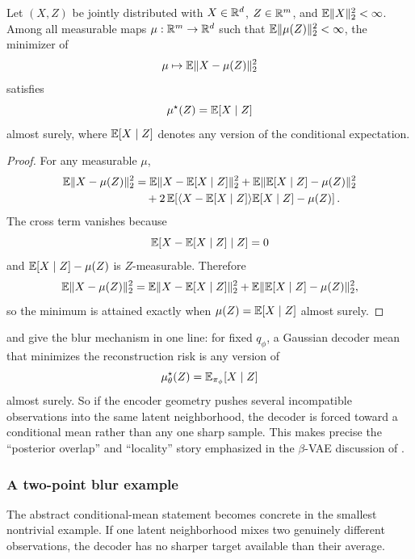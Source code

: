 \documentclass[11pt]{article}
\begin{document}
\begin{proposition}
\label{prop:squared-error-mean}
Let \((X,Z)\) be jointly distributed with \(X\in\mathbb{R}^d\), \(Z\in\mathbb{R}^m\), and \(\mathbb{E}\lVert X\rVert_2^2<\infty\).
Among all measurable maps \(\mu:\mathbb{R}^m\to\mathbb{R}^d\) such that \(\mathbb{E}\lVert\mu(Z)\rVert_2^2<\infty\), the minimizer of
\[
  \mu\mapsto \mathbb{E}\lVert X-\mu(Z)\rVert_2^2
\]
satisfies
\[
  \mu^\star(Z)=\mathbb{E}[X\mid Z]
\]
almost surely, where \(\mathbb{E}[X\mid Z]\) denotes any version of the conditional expectation.
\end{proposition}
\begin{proof}
For any measurable \(\mu\),
\begin{align*}
  \mathbb{E}\lVert X-\mu(Z)\rVert_2^2
  &=
  \mathbb{E}\lVert X-\mathbb{E}[X\mid Z]\rVert_2^2
  +
  \mathbb{E}\lVert\mathbb{E}[X\mid Z]-\mu(Z)\rVert_2^2 \\
  &\quad
  +
  2\,\mathbb{E}\!\left[
    \langle X-\mathbb{E}[X\mid Z]\rangle{\mathbb{E}[X\mid Z]-\mu(Z)}
  \right].
\end{align*}
The cross term vanishes because
\[
  \mathbb{E}\!\left[X-\mathbb{E}[X\mid Z]\mid Z\right]=0
\]
and \(\mathbb{E}[X\mid Z]-\mu(Z)\) is \(Z\)-measurable.
Therefore
\[
  \mathbb{E}\lVert X-\mu(Z)\rVert_2^2
  =
  \mathbb{E}\lVert X-\mathbb{E}[X\mid Z]\rVert_2^2
  +
  \mathbb{E}\lVert\mathbb{E}[X\mid Z]-\mu(Z)\rVert_2^2,
\]
so the minimum is attained exactly when \(\mu(Z)=\mathbb{E}[X\mid Z]\) almost surely.%
\end{proof}

 and  give the blur mechanism in one line:
for fixed \(q_\phi\), a Gaussian decoder mean that minimizes the reconstruction risk is any version of
\[
  \mu_\theta^\star(Z)=\mathbb{E}_{\pi_\phi}[X\mid Z]
\]
almost surely.
So if the encoder geometry pushes several incompatible observations into the same latent neighborhood, the decoder is forced toward a conditional mean rather than any one sharp sample.
This makes precise the ``posterior overlap'' and ``locality'' story emphasized in the \(\beta\)-VAE discussion of \citet[\S\S4.2--5]{burgess_higgins_pal_matthey_watters_desjardins_lerchner_2018_understanding_bvae}.

\subsubsection{A two-point blur example}
\label{subsubsec:two-point-blur}

The abstract conditional-mean statement becomes concrete in the smallest nontrivial example.
If one latent neighborhood mixes two genuinely different observations, the decoder has no sharper target available than their average.
\end{document}
